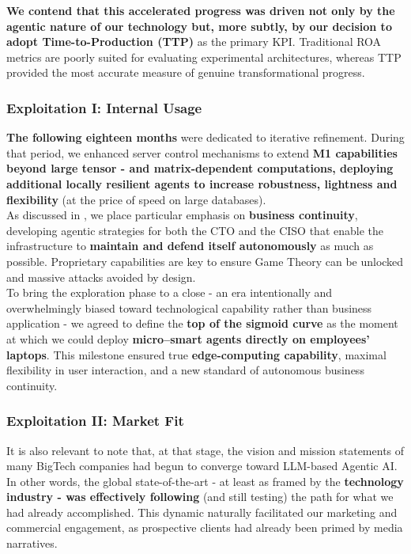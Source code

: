 \documentclass{article}
\begin{document}
\textbf{We contend that this accelerated progress was driven not only by the agentic nature of our technology but, more subtly, by our decision to adopt Time-to-Production (TTP)} as the primary KPI. Traditional ROA metrics are poorly suited for evaluating experimental architectures, whereas TTP provided the most accurate measure of genuine transformational progress.\\

\subsubsection{Exploitation I: Internal Usage}
\label{subsubsection: Exploitation I: Internal Usage}

\textbf{The following eighteen months} were dedicated to iterative refinement. During that period, we enhanced server control mechanisms to extend \textbf{M1 capabilities beyond large tensor - and matrix-dependent computations, deploying additional locally resilient agents to increase robustness, lightness and flexibility} (at the price of speed on large databases).\\

As discussed in \cite{Modern Cybersecurity}, we place particular emphasis on \textbf{business continuity}, developing agentic strategies for both the CTO and the CISO that enable the infrastructure to \textbf{maintain and defend itself autonomously} as much as possible. Proprietary capabilities are key to ensure Game Theory can be unlocked and massive attacks avoided by design.\\

To bring the exploration phase to a close - an era intentionally and overwhelmingly biased toward technological capability rather than business application - we agreed to define the \textbf{top of the sigmoid curve} as the moment at which we could deploy \textbf{micro–smart agents directly on employees’ laptops}. This milestone ensured true \textbf{edge-computing capability}, maximal flexibility in user interaction, and a new standard of autonomous business continuity.\\

\subsubsection{Exploitation II: Market Fit}
\label{subsubsection: Exploitation II: Market Fit}

It is also relevant to note that, at that stage, the vision and mission statements of many BigTech companies had begun to converge toward LLM-based Agentic AI. In other words, the global state-of-the-art - at least as framed by the \textbf{technology industry - was effectively following} (and still testing) the path for what we had already accomplished. This dynamic naturally facilitated our marketing and commercial engagement, as prospective clients had already been primed by media narratives.\\
\end{document}
